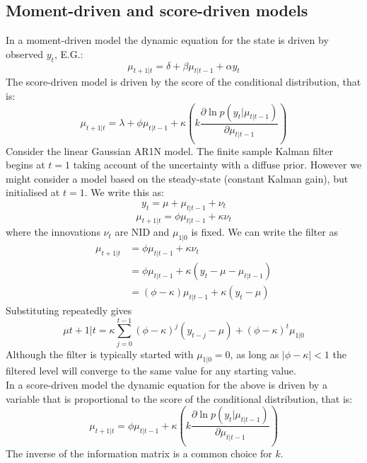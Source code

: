 \documentclass[DIV=14,titlepage=false]{scrreprt}
\begin{document}
\subsection{Moment-driven and score-driven models}
In a moment-driven model the dynamic equation for the state is driven by observed $y_t$, E.G.:
\[
    \mu_{t+1|t} = \delta + \beta \mu_{t|t-1} + \alpha y_t
\]
The score-driven model is driven by the score of the conditional distribution, that is:
\[
    \mu_{t+1|t} = \lambda + \phi \mu_{t|t-1} + \kappa \left( k \frac{\partial \ln p(y_t|\mu_{t|t-1})}{\partial \mu_{t|t-1}} \right)
\]
Consider the linear Gaussian AR1N model. The finite sample Kalman filter begins at $t=1$ taking account of the uncertainty with a diffuse prior. However we might consider a model based on the steady-state (constant Kalman gain), but initialised at $t=1$. We write this as:
\[
    y_t = \mu + \mu_{t|t-1} + \nu_t
\]
\[
    \mu_{t+1|t} = \phi \mu_{t|t-1} + \kappa \nu_t
\]
where the innovations $\nu_t$  are NID and $\mu_{1|0}$ is fixed. We can write the filter as
\begin{align*}
    \mu_{t+1|t} &= \phi \mu_{t|t-1} + \kappa \nu_t\\
    &= \phi \mu_{t|t-1} + \kappa (y_t - \mu - \mu_{t|t-1})\\
    &= (\phi - \kappa)\mu_{t|t-1} + \kappa (y_t - \mu)
\end{align*}
Substituting repeatedly gives 
\[
    \mu{t+1|t} = \kappa \sum_{j=0}^{t-1} (\phi - \kappa)^j (y_{t-j} - \mu) + (\phi - \kappa)^t \mu_{1|0}
\]
Although the filter is typically started with $\mu_{1|0} = 0$, as long as $|\phi - \kappa | <1$ the filtered level will converge to the same value for any starting value.\\
In a score-driven model the dynamic equation for the above is driven by a variable that is proportional to the score of the conditional distribution, that is:
\[
    \mu_{t+1|t} = \phi \mu_{t|t-1} + \kappa \left( k \frac{\partial \ln p(y_t|\mu_{t|t-1})}{\partial \mu_{t|t-1}} \right)
    \]
The inverse of the information matrix is a common choice for $k$.
\end{document}
